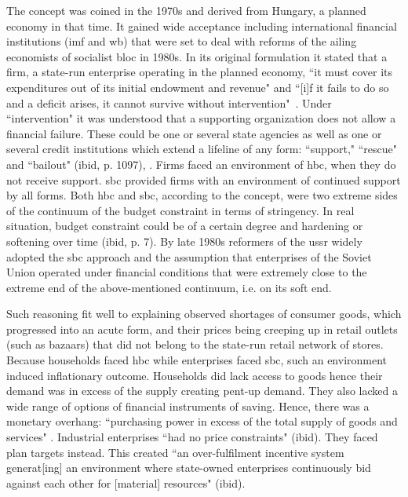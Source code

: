 The concept was coined in the 1970s and derived from Hungary, a planned economy in that time. It gained wide acceptance including international financial institutions (\ac{imf} and \acf{wb}) that were set to deal with reforms of the ailing economists of socialist bloc in 1980s. In its original formulation it stated that a firm, a state-run enterprise operating in the planned economy, ``it must cover its expenditures out of its initial endowment and revenue" and ``[i]f it fails to do so and a deficit arises, it cannot survive without intervention"~\citep[p.~1097]{kornai2003}. Under ``intervention" it was understood that a supporting organization does not allow a financial failure. These could be one or several state agencies as well as one or several credit institutions which extend a lifeline of any form: ``support," ``rescue" and ``bailout" (ibid, p. 1097), \citep[p.~6]{kornai1986}. Firms faced an environment of \acf{hbc}, when they do not receive support. \acf{sbc} provided firms with an environment of continued support by all forms. Both \ac{hbc} and \ac{sbc}, according to the concept, were two extreme sides of the continuum of the budget constraint in terms of stringency. In real situation, budget constraint could be of a certain degree and hardening or softening over time (ibid, p. 7). By late 1980s reformers of the \ac{ussr} widely adopted the \ac{sbc} approach and the assumption that enterprises of the Soviet Union operated under financial conditions that were extremely close to the extreme end of the above-mentioned continuum, i.e. on its soft end. 

Such reasoning fit well to explaining observed shortages of consumer goods, which progressed into an acute form, and their prices being creeping up in retail outlets (such as bazaars) that did not belong to the state-run retail network of stores. Because households faced \ac{hbc} while enterprises faced \ac{sbc}, such an environment induced inflationary outcome. Households did lack access to goods hence their demand was in excess of the supply creating pent-up demand. They also lacked a wide range of options of financial instruments of saving. Hence, there was a monetary overhang: ``purchasing power in excess of the total supply of goods and services" \citep[p.~234]{gabor2012}. Industrial enterprises ``had no price constraints" (ibid). They faced plan targets instead. This created ``an over-fulfilment incentive system generat[ing] an environment where state-owned enterprises continuously bid against each other for [material] resources" (ibid). 

